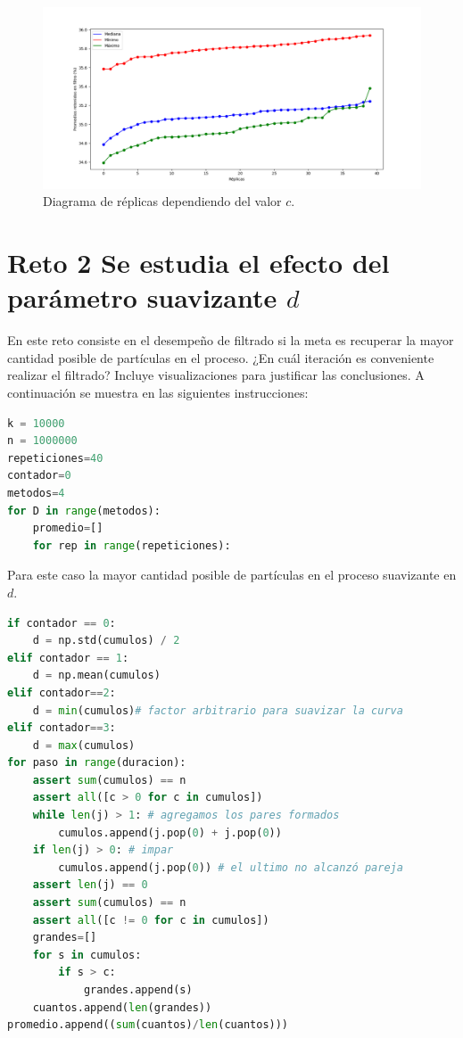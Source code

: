 \documentclass{article}
\begin{document}
\begin{figure}
    \centering
    \includegraphics[width=210mm]{R1_plot.png}
    \caption{Diagrama de réplicas dependiendo del valor $c$.}
    \label{figure}
\end{figure}

\newpage

\section{Reto 2 Se estudia el efecto del parámetro suavizante $d$}\label{}
En este reto consiste en el desempeño de filtrado si la meta es recuperar la mayor cantidad posible de partículas en el proceso. ¿En cuál iteración es conveniente realizar el filtrado? Incluye visualizaciones para justificar las conclusiones. A continuación se muestra en las siguientes instrucciones: 

\begin{lstlisting}[caption=Generación de repeticiones, language=Python]
k = 10000
n = 1000000
repeticiones=40
contador=0
metodos=4 
for D in range(metodos):
    promedio=[]
    for rep in range(repeticiones):
\end{lstlisting}

Para este caso la mayor cantidad posible de partículas en el proceso suavizante en $d$.
\begin{lstlisting}[caption=Promedio en el suavizante $d$, language=Python]
if contador == 0:
    d = np.std(cumulos) / 2
elif contador == 1:
    d = np.mean(cumulos)
elif contador==2:
    d = min(cumulos)# factor arbitrario para suavizar la curva
elif contador==3:
    d = max(cumulos)
for paso in range(duracion):
    assert sum(cumulos) == n
    assert all([c > 0 for c in cumulos]) 
    while len(j) > 1: # agregamos los pares formados
        cumulos.append(j.pop(0) + j.pop(0))
    if len(j) > 0: # impar
        cumulos.append(j.pop(0)) # el ultimo no alcanzó pareja
    assert len(j) == 0
    assert sum(cumulos) == n
    assert all([c != 0 for c in cumulos])
    grandes=[]
    for s in cumulos:
        if s > c:
            grandes.append(s)
    cuantos.append(len(grandes))
promedio.append((sum(cuantos)/len(cuantos)))
\end{lstlisting}
\end{document}
